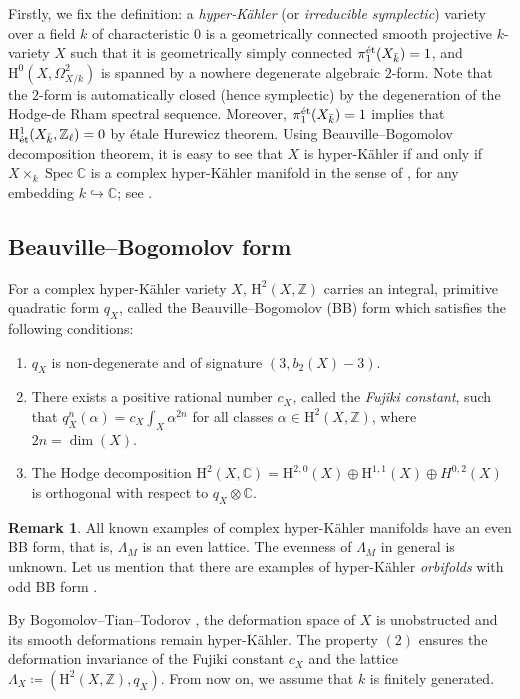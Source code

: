 \documentclass[11pt,reqno,oneside]{amsart}
\numberwithin{equation}{section}
\theoremstyle{definition}
\newtheorem{remark}[theorem]{Remark}
\DeclareMathOperator{\Spec}{Spec}
\DeclareMathOperator{\et}{\Acute{e}t}
\newcommand\rH{\mathrm{H}}
\newcommand{\CC}{\mathbb{C}}
\newcommand{\ZZ}{\mathbb{Z}}
\begin{document}
Firstly, we fix the definition: a {\it  hyper-Kähler} (or  {\it irreducible symplectic}) variety over a field $k$ of characteristic $0$ is a geometrically connected smooth projective $k$-variety $X$ such that it is geometrically simply connected $\pi_1^{\et}(X_{\bar{k}})=1$, and $\rH^0(X,\Omega^2_{X/k})$ is spanned by a nowhere degenerate algebraic
$2$-form. Note that the $2$-form is automatically closed (hence symplectic) by the degeneration of the Hodge-de Rham spectral sequence. Moreover, $\pi_1^{\et}(X_{\bar{k}})=1$ implies that $\rH^1_{\et}(X_{\bar{k}},\ZZ_{\ell})=0$ by \'etale Hurewicz theorem. Using Beauville--Bogomolov decomposition theorem, it is easy to see that $X$ is hyper-Kähler if and only if $X\times_k \Spec\CC$ is a complex hyper-Kähler manifold in the sense of \cite{Bea83, MR1664696}, for any embedding $k\hookrightarrow \CC$; see \cite[Lemma 3.1.3]{BindtThesis}.

\subsection{Beauville--Bogomolov form} 
\label{subsec:BBform}
For a complex hyper-Kähler variety $X$, $\rH^2(X, \ZZ)$ carries an integral, primitive quadratic form $q_X$,  called the Beauville--Bogomolov (BB) form which satisfies the following conditions:

\begin{enumerate}
	\item $q_X$ is non-degenerate and of signature $(3,b_2(X)-3)$.
	\item  There exists a positive rational number $c_X$, called the {\it Fujiki constant}, such that $q_X^n(\alpha)=c_X\int_X \alpha^{2n}$ for all classes $\alpha\in \rH^2(X,\ZZ)$, where $2n=\dim(X)$.
	\item The Hodge decomposition $\rH^2(X, \CC)=\rH^{2,0}(X)\oplus \rH^{1,1}(X)\oplus H^{0,2}(X)$ is orthogonal with respect to $q_X\otimes \CC$. 
\end{enumerate}

\begin{remark}
\label{rmk:evenness}
	All known examples of complex hyper-Kähler manifolds have an even BB form, that is, $\Lambda_M$ is an even lattice.  The evenness of $\Lambda_M$ in general is unknown. Let us mention that there are examples of hyper-Kähler \textit{orbifolds} with odd BB form \cite{KapferMenet}.
\end{remark} 

By Bogomolov--Tian--Todorov \cite{Bo78}, the deformation space of $X$ is unobstructed and its smooth deformations remain hyper-Kähler. The property $(2)$  ensures the deformation invariance of the Fujiki constant $c_X$ and the lattice $\Lambda_X\coloneqq(\rH^2(X,\ZZ), q_X)$. From now on, we assume that $k$ is finitely generated. 
\end{document}
